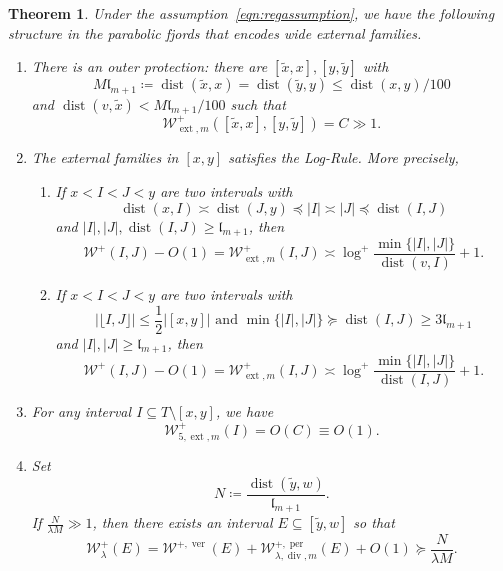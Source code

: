 \documentclass{amsart}
\newcommand{\1}{{\mathbb 1 }}
\newcommand{\ext}{{\operatorname{ext}}}
\renewcommand{\div}{{\operatorname{div}}}
\newcommand{\Width}{{\mathcal W}}
\newcommand{\length}{{\mathfrak l}}
\newcommand\ver{{\operatorname{ver}}}
\newcommand\per{{\operatorname{per}}}
\newtheorem{thm}{Theorem}[section]
\theoremstyle{remark}
\numberwithin{equation}{section}
\theoremstyle{definition}
\newcommand{\dist}{\operatorname{dist}}
\begin{document}
\begin{thm}
\label{thm:parabolicfjords}
Under the assumption~\eqref{eqn:regassumption}, we have the following structure in the parabolic fjords that encodes wide external families.
\begin{enumerate}[label=(\arabic*)]
    \item \label{item:1:thm:parabolicfjords} There is an outer protection: there are $[\widetilde{x}, x], [y, \widetilde{y}]$ with \begin{equation}\label{eq:dfn:M} M\length_{m+1} \coloneqq \dist(\widetilde{x}, x) = \dist(\widetilde{y}, y) \leq \dist(x, y)/100\end{equation} and $\dist(v, \widetilde{x}) < M \length_{m+1}/100$
such that    
    $$
     \Width^{+}_{\ext, m}([\widetilde{x},x], [y, \widetilde{y}]) = C \gg 1.
    $$
    \item \label{item:2:thm:parabolicfjords}  The external families in $[x, y]$ satisfies the Log-Rule. More precisely,
    \begin{enumerate}[label=(\roman*)]
        \item\label{item:2:1:thm:parabolicfjords} If $x < I < J < y$ are two intervals with 
        $$
        \dist(x, I) \asymp \dist(J, y) \preceq |I| \asymp |J| \preceq \dist(I, J)
        $$
        and $|I|, |J|, \dist(I, J) \geq \length_{m+1}$, then 
         \begin{equation}
           \label{eq:1:thm:parabolicfjords}
        \Width^+(I,J) - O(1) = \Width^+_{\ext, m}(I, J) \asymp \log^+ \frac{\min\{|I|, |J|\}}{\dist(v, I)} + 1.
        \end{equation}
        \item \label{item:2:2:thm:parabolicfjords} If $x < I < J < y$ are two intervals with 
        $$
        |\lfloor I, J \rfloor| \leq \frac{1}{2}|[x,y]| \text{ and } \min\{|I|, |J|\} \succeq \dist(I, J) \geq 3 \length_{m+1}
        $$
        and $|I|, |J| \geq \length_{m+1}$, then 
        \begin{equation}
           \label{eq:2:thm:parabolicfjords}         
        \Width^+(I,J) - O(1) = \Width^+_{\ext, m}(I, J) \asymp \log^+ \frac{\min\{|I|, |J|\}}{\dist(I, J)} + 1.
        \end{equation}
    \end{enumerate}
    \item \label{item:3:thm:parabolicfjords} For any interval $I \subseteq T\setminus [x,y]$, we have
    $$
    \Width^{+}_{5, \ext, m}(I) = O(C)\equiv O(1).
    $$
    \item\label{item:4:thm:parabolicfjords} Set 
    \begin{equation}\label{eq:dfn:N}
    N \coloneqq \frac{\dist(\widetilde{y}, w)}{\length_{m+1}}.
\end{equation}
If $\frac{N}{\lambda M} \gg 1$, then there exists an interval $E \subseteq [\widetilde{y}, w]$ so that
\[\Width^{+}_\lambda(E) = \Width^{+, \ver}(E)+\Width^{+, \per}_{\lambda,\div,m}(E) + O(1) \succeq \frac{N}{\lambda M}.\]
\end{enumerate}
\end{thm}
\end{document}
